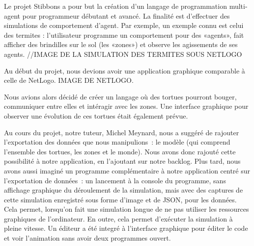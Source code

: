 
Le projet Stibbons a pour but la création d'un langage de programmation multi-agent pour programmeur débutant et avancé.
La finalité est d'effectuer des simulations de comportement d'agent. Par exemple, un exemple connu est celui des termites : l'utilisateur programme un comportement pour des «agents», fait afficher des brindilles sur le sol (les «zones») et observe les agissements de ses agents.
//IMAGE DE LA SIMULATION DES TERMITES SOUS NETLOGO

Au début du projet, nous devions avoir une application graphique comparable à celle de NetLogo.
IMAGE DE NETLOGO.

Nous avions alors décidé de créer un langage où des tortues pourront bouger, communiquer entre elles et intéragir avec les zones. Une interface graphique pour observer une évolution de ces tortues était également prévue.

Au cours du projet, notre tuteur, Michel Meynard, nous a suggéré de rajouter l'exportation des données que nous manipulions~: le modèle (qui comprend l'ensemble des tortues, les zones et le monde). Nous avons donc rajouté cette possibilité à notre application, en l'ajoutant sur notre backlog.
Plus tard, nous avons aussi imaginé un programme complémentaire à notre application centré sur l'exportation de données~: un lancement à la console du programme, sans affichage graphique du déroulement de la simulation, mais avec des captures de cette simulation enregistré sous forme d'image et de JSON, pour les données.
Cela permet, lorsqu'on fait une simulation longue de ne pas utiliser les ressources graphiques de l'ordinateur. En outre, cela permet d'exécuter la simulation à pleine vitesse.
Un éditeur a été integré à l'interface graphique pour éditer le code et voir l'animation sans avoir deux programmes ouvert.
